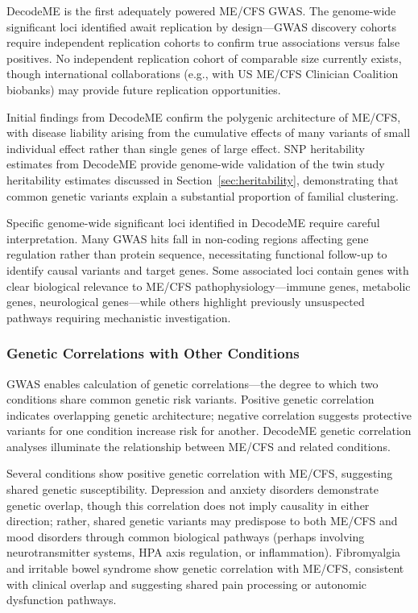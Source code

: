 \begin{warning}
DecodeME is the first adequately powered ME/CFS GWAS. The genome-wide significant loci identified await replication by design---GWAS discovery cohorts require independent replication cohorts to confirm true associations versus false positives. No independent replication cohort of comparable size currently exists, though international collaborations (e.g., with US ME/CFS Clinician Coalition biobanks) may provide future replication opportunities.
\end{warning}

Initial findings from DecodeME confirm the polygenic architecture of ME/CFS, with disease liability arising from the cumulative effects of many variants of small individual effect rather than single genes of large effect. SNP heritability estimates from DecodeME provide genome-wide validation of the twin study heritability estimates discussed in Section~\ref{sec:heritability}, demonstrating that common genetic variants explain a substantial proportion of familial clustering.

Specific genome-wide significant loci identified in DecodeME require careful interpretation. Many GWAS hits fall in non-coding regions affecting gene regulation rather than protein sequence, necessitating functional follow-up to identify causal variants and target genes. Some associated loci contain genes with clear biological relevance to ME/CFS pathophysiology---immune genes, metabolic genes, neurological genes---while others highlight previously unsuspected pathways requiring mechanistic investigation.

\subsubsection{Genetic Correlations with Other Conditions}

GWAS enables calculation of genetic correlations---the degree to which two conditions share common genetic risk variants. Positive genetic correlation indicates overlapping genetic architecture; negative correlation suggests protective variants for one condition increase risk for another. DecodeME genetic correlation analyses illuminate the relationship between ME/CFS and related conditions.

Several conditions show positive genetic correlation with ME/CFS, suggesting shared genetic susceptibility. Depression and anxiety disorders demonstrate genetic overlap, though this correlation does not imply causality in either direction; rather, shared genetic variants may predispose to both ME/CFS and mood disorders through common biological pathways (perhaps involving neurotransmitter systems, HPA axis regulation, or inflammation). Fibromyalgia and irritable bowel syndrome show genetic correlation with ME/CFS, consistent with clinical overlap and suggesting shared pain processing or autonomic dysfunction pathways.

